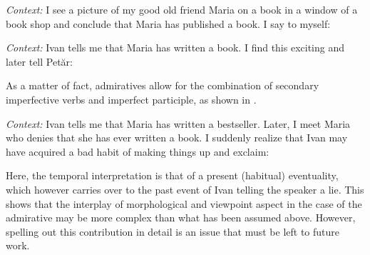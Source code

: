 \documentclass[output=paper,
colorlinks,
citecolor=brown,
newtxmath
]{langscibook}
\begin{document}
    \largerpage[-1]

\eanoraggedright\label{ex:napisala} \textit{Context:} I see a picture of my good old friend Maria on a book in a window of a book shop and conclude that Maria has published a book. I say to myself:\vspace{-6pt}
\z
\begin{exe}
\end{exe}

\eanoraggedright\label{ex:napisala2} \textit{Context:} Ivan tells me that Maria has written a book. I find this exciting and later tell Petăr:\vspace{-6pt}
\z
\begin{exe}
\end{exe}

\noindent As a matter of fact, admiratives allow for the combination of secondary imperfective verbs and imperfect participle, as shown in .

\eanoraggedright\label{ex:izmisljal} \textit{Context:} Ivan tells me that Maria has written a bestseller. Later, I meet Maria who denies that she has ever written a book. I suddenly realize that Ivan may have acquired a bad habit of making things up and exclaim:\vspace{-6pt}
\z
\begin{exe}
\end{exe}

\noindent Here, the temporal interpretation is that of a present (habitual) eventuality, which however carries over to the past event of Ivan telling the speaker a lie. This shows that the interplay of morphological and viewpoint aspect in the case of the  admirative may be more complex than what has been assumed above. However, spelling out this contribution in detail is an issue that must be left to future work.
\end{document}
